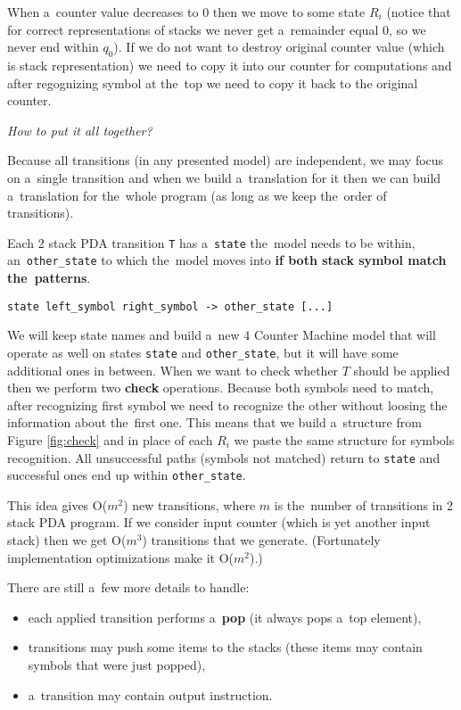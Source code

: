 \documentclass[english,shortabstract,mgr]{iithesis}
\begin{document}
When a~counter value decreases to $0$ then we move to some state $R_i$ (notice that for
correct representations of stacks we never get a~remainder equal $0$, so we never end within $q_0$).
If we do not want to destroy original counter value (which is stack representation) we need
to copy it into our counter for computations and after regognizing symbol at the~top
we need to copy it back to the original counter.

\textit{How to put it all together?}

Because all transitions (in any presented model) are independent, we may focus on a~single
transition and when we build a~translation for it then we can build a~translation for the~whole
program (as long as we keep the~order of transitions).

Each 2 stack PDA transition \texttt{T} has a~\texttt{state} the~model needs to be within,
an~\texttt{other\_state} to which the~model moves into \textbf{if both stack symbol match
the~patterns}.

\begin{verbatim}
state left_symbol right_symbol -> other_state [...]
\end{verbatim}

We will keep state names and build a~new 4 Counter Machine model that will operate as well
on states \texttt{state} and \texttt{other\_state}, but it will have some additional ones
in between. When we want to check whether $T$ should be applied then we perform two
\textbf{check} operations. Because both symbols need to match, after recognizing first symbol
we need to recognize the other without loosing the information about the~first one. This
means that we build a~structure from Figure \ref{fig:check} and in place of each $R_i$ we
paste the same structure for symbols recognition. All unsuccessful paths (symbols not matched)
return to \texttt{state} and successful ones end up within \texttt{other\_state}.

This idea gives O($m^2$) new transitions, where $m$ is the~number of transitions in 2 stack PDA
program. If we consider input counter (which is yet another input stack) then we get O($m^3$)
transitions that we generate. (Fortunately implementation optimizations make it O($m^2$).)

There are still a~few more details to handle:
\begin{itemize}
  \item each applied transition performs a~\textbf{pop} (it always pops a~top element),
  \item transitions may push some items to the stacks (these items may contain symbols that
      were just popped),
  \item a~transition may contain output instruction.
\end{itemize}
\end{document}
